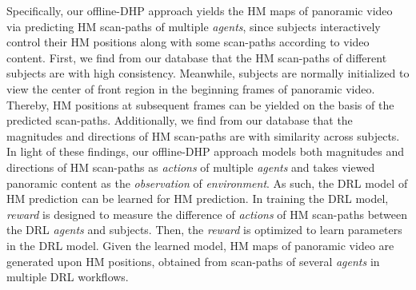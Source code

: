 \documentclass[10pt,journal,compsoc]{IEEEtran}
\begin{document}

Specifically, our offline-DHP approach yields the HM maps of panoramic video via predicting HM scan-paths of multiple \textit{agents}, since subjects interactively control their HM positions along with some scan-paths according to video content.
First, we find from our database that the HM scan-paths of different subjects are with high consistency.
Meanwhile, subjects are normally initialized to view the center of front region in the beginning frames of panoramic video.
Thereby, HM positions at subsequent frames can be yielded on the basis of the predicted scan-paths.
Additionally, we find from our database that the magnitudes and directions of HM scan-paths are with similarity across subjects.
In light of these findings, our offline-DHP approach models both magnitudes and directions of HM scan-paths as \textit{actions} of multiple \textit{agents} and takes viewed panoramic content as the \textit{observation} of \textit{environment}.
As such, the DRL model of HM prediction  can be learned for HM prediction.
In training the DRL model, \textit{reward} is designed to measure the difference of \textit{actions} of HM scan-paths between the DRL \textit{agents} and subjects. Then, the \textit{reward} is optimized to learn parameters in the DRL model.
Given the learned model, HM maps of panoramic video are generated upon HM positions, obtained from scan-paths of several \textit{agents} in multiple DRL workflows.

\end{document}

